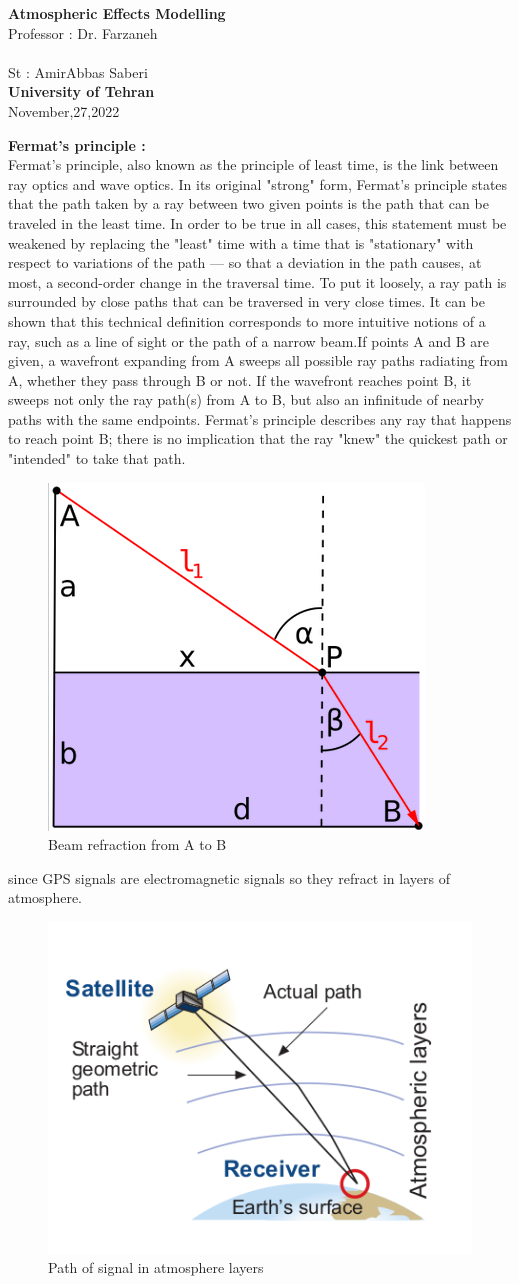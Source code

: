 \documentclass[12pt]{article}
\begin{document}
\begin{center}
\textbf{Atmospheric Effects Modelling} \\[1in]
Professor : Dr. Farzaneh\\~\\
St : AmirAbbas Saberi
\\[4in]
\textbf{University of Tehran}\\
November,27,2022
\end{center}
	\thispagestyle{firstpage}
\newpage
\textbf{Fermat's principle :}\\
Fermat's principle, also known as the principle of least time, is the link between ray optics and wave optics. In its original "strong" form, Fermat's principle states that the path taken by a ray between two given points is the path that can be traveled in the least time. In order to be true in all cases, this statement must be weakened by replacing the "least" time with a time that is "stationary" with respect to variations of the path — so that a deviation in the path causes, at most, a second-order change in the traversal time. To put it loosely, a ray path is surrounded by close paths that can be traversed in very close times. It can be shown that this technical definition corresponds to more intuitive notions of a ray, such as a line of sight or the path of a narrow beam.If points A and B are given, a wavefront expanding from A sweeps all possible ray paths radiating from A, whether they pass through B or not. If the wavefront reaches point B, it sweeps not only the ray path(s) from A to B, but also an infinitude of nearby paths with the same endpoints. Fermat's principle describes any ray that happens to reach point B; there is no implication that the ray "knew" the quickest path or "intended" to take that path. 
\begin{figure}[H]
	\centering
    \includegraphics[width=0.2 \textwidth]{img/1}
    \caption{Beam refraction from A to B}
\end{figure}
since GPS signals are electromagnetic signals so they refract in layers of atmosphere.
 \begin{figure}[H]
	\centering
    \includegraphics[width=0.4 \textwidth]{img/2}
    \caption{Path of signal in atmosphere layers}
\end{figure}
\end{document}
